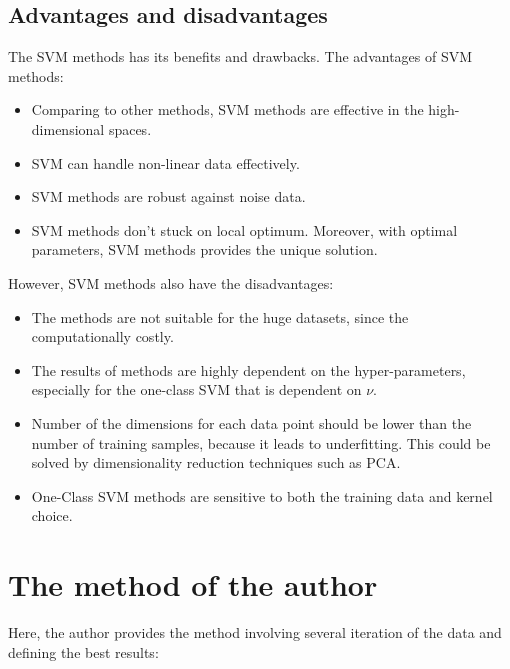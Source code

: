 \documentclass[paper=8.27in:11.69in, 11pt]{scrartcl}
\begin{document}
\subsection{Advantages and disadvantages}
The SVM methods has its benefits and drawbacks\cite{karamizadeh2014advantage}\cite{internetArticle}. The advantages of SVM methods:
\begin{itemize}
\item Comparing to other methods, SVM methods are effective in the high-dimensional spaces.
\item SVM can handle non-linear data effectively.
\item SVM methods are robust against noise data.
\item SVM methods don't stuck on local optimum. Moreover, with optimal parameters, SVM methods provides the unique solution.
\end{itemize}

However, SVM methods also have the disadvantages:
\begin{itemize}
\item The methods are not suitable for the huge datasets, since the computationally costly.
\item The results of methods are highly dependent on the hyper-parameters, especially for the one-class SVM that is dependent on $\nu$.
\item Number of the dimensions for each data point should be lower than the number of training samples, because it leads to underfitting. This could be solved by dimensionality reduction techniques such as PCA. \cite{zhanchun2006anomaly}
\item One-Class SVM methods are sensitive to both the training data and kernel choice.
\end{itemize}

\section{The method of the author}
Here, the author provides the method involving several iteration of the data and defining the best results:
\end{document}
